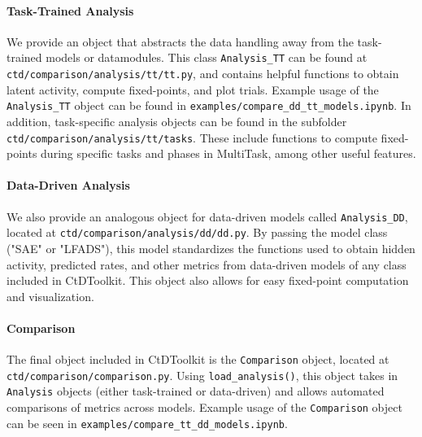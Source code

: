 \documentclass{article}
\begin{document}
\paragraph{Task-Trained Analysis}
We provide an object that abstracts the data handling away from the task-trained models or datamodules. This class \texttt{Analysis\_TT} can be found at \texttt{ctd/comparison/analysis/tt/tt.py}, and contains helpful functions to obtain latent activity, compute fixed-points, and plot trials. Example usage of the \texttt{Analysis\_TT} object can be found in \texttt{examples/compare\_dd\_tt\_models.ipynb}. In addition, task-specific analysis objects can be found in the subfolder \texttt{ctd/comparison/analysis/tt/tasks}. These include functions to compute fixed-points during specific tasks and phases in MultiTask, among other useful features.

\paragraph{Data-Driven Analysis}
We also provide an analogous object for data-driven models called \texttt{Analysis\_DD}, located at \texttt{ctd/comparison/analysis/dd/dd.py}. By passing the model class ("SAE" or "LFADS"), this model standardizes the functions used to obtain hidden activity, predicted rates, and other metrics from data-driven models of any class included in CtDToolkit. This object also allows for easy fixed-point computation and visualization.

\paragraph{Comparison}
The final object included in CtDToolkit is the \texttt{Comparison} object, located at \texttt{ctd/comparison/comparison.py}. Using \texttt{load\_analysis()}, this object takes in \texttt{Analysis} objects (either task-trained or data-driven) and allows automated comparisons of metrics across models. Example usage of the \texttt{Comparison} object can be seen in \texttt{examples/compare\_tt\_dd\_models.ipynb}.


\clearpage
\end{document}
